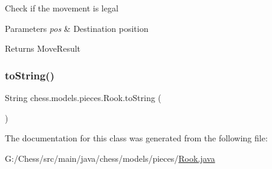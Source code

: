 Check if the movement is legal 
\begin{DoxyParams}{Parameters}
{\em pos} & Destination position \\
\hline
\end{DoxyParams}
\begin{DoxyReturn}{Returns}
Move\+Result 
\end{DoxyReturn}
\mbox{\label{classchess_1_1models_1_1pieces_1_1_rook_a73f28ce35486a866fabe250ad4490993}} 
\subsubsection{\texorpdfstring{to\+String()}{toString()}}
{\footnotesize\ttfamily String chess.\+models.\+pieces.\+Rook.\+to\+String (\begin{DoxyParamCaption}{ }\end{DoxyParamCaption})}



The documentation for this class was generated from the following file\+:\begin{DoxyCompactItemize}
\item 
G\+:/\+Chess/src/main/java/chess/models/pieces/\mbox{\hyperlink{_rook_8java}{Rook.\+java}}\end{DoxyCompactItemize}
